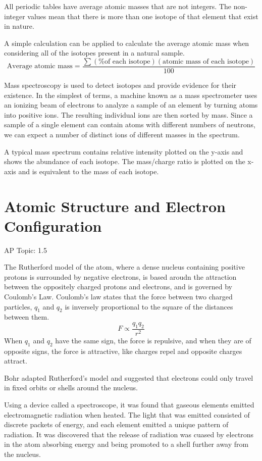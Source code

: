 \documentclass[../chem.tex]{subfiles}
\begin{document}
All periodic tables have average atomic masses that are not integers. The non-integer values mean that there is more than one isotope of that element that exist in nature.

A simple calculation can be applied to calculate the average atomic mass when considering all of the isotopes present in a natural sample.
\[\text{Average atomic mass}=\frac{\sum (\%\text{of each isotope})(\text{atomic mass of each isotope})}{100}\]

Mass spectroscopy is used to detect isotopes and provide evidence for their existence. In the simplest of terms, a machine known as a 
mass spectrometer uses an ionizing beam of electrons to analyze a sample of an element by turning atoms into positive ions. The resulting individual ions 
are then sorted by mass. Since a sample of a single element can contain atoms with different numbers of neutrons, we can expect a number of distinct ions of different masses in the spectrum.

A typical mass spectrum contains relative intensity plotted on the y-axis and shows the abundance of each isotope. The mass/charge ratio 
is plotted on the x-axis and is equivalent to the mass of each isotope.

\section{Atomic Structure and Electron Configuration}
AP Topic: 1.5

The Rutherford model of the atom, where a dense nucleus containing positive protons is surrounded by negative electrons, is based aroudn the attraction between the oppositely charged protons and electrons, and is governed by Coulomb's Law.
Coulomb's law states that the force between two charged particles, $q_1$ and $q_2$ is inversely proportional to the square of the distances between them.
\[F\propto \frac{q_1q_2}{r^2}\]
When $q_1$ and $q_2$ have the same sign, the force is repulsive, and when they are of opposite signs, the force is attractive, like charges repel and opposite charges attract.

Bohr adapted Rutherford's model and suggested that electrons could only travel in fixed orbits or shells around the nucleus.

Using a device called a spectroscope, it was found that gaseous elements emitted electromagnetic radiation when heated. The light that was emitted consisted of discrete packets of energy,
and each element emitted a unique pattern of radiation. It was discovered that the release of radiation was cuased by electrons in the atom absorbing energy and being promoted
to a shell further away from the nucleus.
\end{document}

